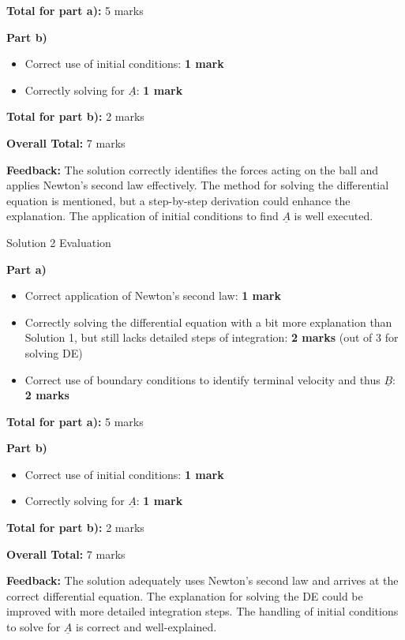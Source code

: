 \documentclass[a4paper,11pt]{article}
\begin{document}
\textbf{Total for part a):} 5 marks

\textbf{Part b)}
\begin{itemize}
    \item Correct use of initial conditions: \textbf{1 mark}
    \item Correctly solving for \( \underline{A} \): \textbf{1 mark}
\end{itemize}

\textbf{Total for part b):} 2 marks

\textbf{Overall Total:} 7 marks

\textbf{Feedback:} The solution correctly identifies the forces acting on the ball and applies Newton's second law effectively. The method for solving the differential equation is mentioned, but a step-by-step derivation could enhance the explanation. The application of initial conditions to find \( \underline{A} \) is well executed.

Solution 2 Evaluation

\textbf{Part a)}
\begin{itemize}
    \item Correct application of Newton's second law: \textbf{1 mark}
    \item Correctly solving the differential equation with a bit more explanation than Solution 1, but still lacks detailed steps of integration: \textbf{2 marks} (out of 3 for solving DE)
    \item Correct use of boundary conditions to identify terminal velocity and thus \( \underline{B} \): \textbf{2 marks}
\end{itemize}

\textbf{Total for part a):} 5 marks

\textbf{Part b)}
\begin{itemize}
    \item Correct use of initial conditions: \textbf{1 mark}
    \item Correctly solving for \( \underline{A} \): \textbf{1 mark}
\end{itemize}

\textbf{Total for part b):} 2 marks

\textbf{Overall Total:} 7 marks

\textbf{Feedback:} The solution adequately uses Newton's second law and arrives at the correct differential equation. The explanation for solving the DE could be improved with more detailed integration steps. The handling of initial conditions to solve for \( \underline{A} \) is correct and well-explained.
\end{document}
